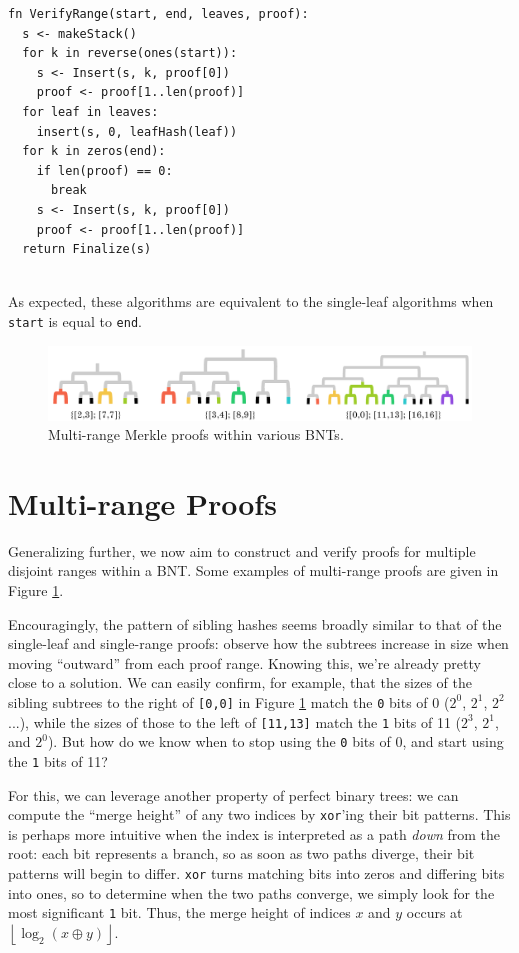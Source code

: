 \documentclass[twocolumn]{article}
\begin{document}
\begin{minipage}[c]{0.95\textwidth}
\begin{lstlisting}
fn VerifyRange(start, end, leaves, proof):
  s <- makeStack()
  for k in reverse(ones(start)):
    s <- Insert(s, k, proof[0])
    proof <- proof[1..len(proof)]
  for leaf in leaves:
    insert(s, 0, leafHash(leaf))
  for k in zeros(end):
    if len(proof) == 0:
      break
    s <- Insert(s, k, proof[0])
    proof <- proof[1..len(proof)]
  return Finalize(s)
  
\end{lstlisting}
\end{minipage}

As expected, these algorithms are equivalent to the single-leaf algorithms when \verb`start` is equal to \verb`end`.


\begin{figure}[t]
\includegraphics[scale=0.27]{multi}
\centering
\caption{Multi-range Merkle proofs within various BNTs.}
\label{img-multi}
\end{figure}


\section{Multi-range Proofs}

Generalizing further, we now aim to construct and verify proofs for multiple disjoint ranges within a BNT. Some examples of multi-range proofs are given in Figure \ref{img-multi}.

Encouragingly, the pattern of sibling hashes seems broadly similar to that of the single-leaf and single-range proofs: observe how the subtrees increase in size when moving ``outward'' from each proof range. Knowing this, we're already pretty close to a solution. We can easily confirm, for example, that the sizes of the sibling subtrees to the right of \verb`[0,0]` in Figure \ref{img-multi} match the \verb`0` bits of 0 ($2^0$, $2^1$, $2^2$...), while the sizes of those to the left of \verb`[11,13]` match the \verb`1` bits of 11 ($2^3$, $2^1$, and $2^0$). But how do we know when to stop using the \verb`0` bits of 0, and start using the \verb`1` bits of 11?

For this, we can leverage another property of perfect binary trees: we can compute the ``merge height'' of any two indices by \verb`xor`'ing their bit patterns. This is perhaps more intuitive when the index is interpreted as a path \textit{down} from the root: each bit represents a branch, so as soon as two paths diverge, their bit patterns will begin to differ. \verb`xor` turns matching bits into zeros and differing bits into ones, so to determine when the two paths converge, we simply look for the most significant \verb`1` bit. Thus, the merge height of indices $x$ and $y$ occurs at $\left \lfloor{\log_2(x \oplus y)}\right \rfloor$.
\end{document}

